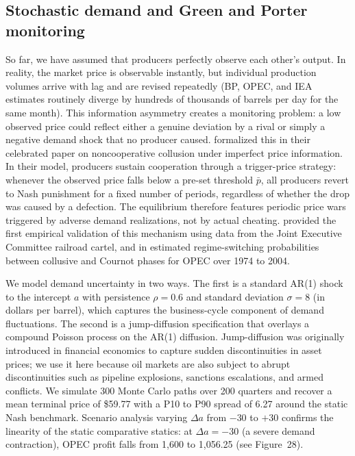 \subsection{Stochastic demand and Green and Porter monitoring}
\label{subsec:greenporter}

So far, we have assumed that producers perfectly observe each other's
output. In reality, the market price is observable instantly, but
individual production volumes arrive with lag and are revised
repeatedly (BP, OPEC, and IEA estimates routinely diverge by hundreds
of thousands of barrels per day for the same month). This information
asymmetry creates a monitoring problem: a low observed price could
reflect either a genuine deviation by a rival or simply a negative
demand shock that no producer caused. \citet{greenporter1984}
formalized this in their celebrated paper on noncooperative collusion
under imperfect price information. In their model, producers sustain
cooperation through a trigger-price strategy: whenever the observed
price falls below a pre-set threshold $\bar{p}$, all producers revert to
Nash punishment for a fixed number of periods, regardless of whether the
drop was caused by a defection. The equilibrium therefore features
periodic price wars triggered by adverse demand realizations, not by
actual cheating. \citet{porter1983} provided the first empirical
validation of this mechanism using data from the Joint Executive
Committee railroad cartel, and \citet{almoguera2011} in 
estimated regime-switching probabilities between collusive and Cournot
phases for OPEC over 1974 to 2004.

We model demand uncertainty in two ways. The first is a standard AR(1)
shock to the intercept $a$ with persistence $\rho = 0.6$ and standard
deviation $\sigma = 8$ (in dollars per barrel), which captures the
business-cycle component of demand fluctuations. The second is a
\citet{merton1976} jump-diffusion specification that overlays a compound
Poisson process on the AR(1) diffusion. Jump-diffusion was originally
introduced in financial economics to capture sudden discontinuities in
asset prices; we use it here because oil markets are also subject to
abrupt discontinuities such as pipeline explosions, sanctions
escalations, and armed conflicts. We simulate 300 Monte Carlo paths
over 200 quarters and recover a mean terminal price of \$59.77 with a
P10 to P90 spread of 6.27 around the static Nash benchmark. Scenario
analysis varying $\Delta a$ from $-30$ to $+30$ confirms the linearity
of the static comparative statics: at $\Delta a = -30$ (a severe demand
contraction), OPEC profit falls from 1,600 to 1,056.25 (see Figure~28).

